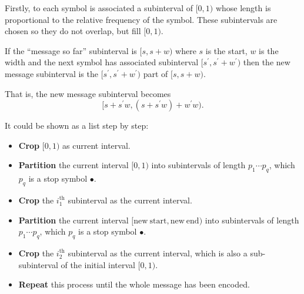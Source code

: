 \documentclass{article}
\begin{document}
Firstly, to each symbol is associated a subinterval of $[0, 1)$ whose length is proportional to the relative frequency of the symbol. These subintervals are chosen so they do not overlap, but fill $[0, 1)$.

If the ``message so far'' subinterval is $[s, s+w)$ where $s$ is the start, $w$ is the width and the next symbol has associated subinterval $[s^{\prime}, s^{\prime}+w^{\prime})$ then the new message subinterval is the $[s^{\prime}, s^{\prime}+w^{\prime})$ part of $[s, s+w)$.

That is, the new message subinterval becomes \[[s+s^{\prime}w, (s+s^{\prime}w)+w^{\prime}w).\]

It could be shown as a list step by step:

\begin{itemize}
    \item \textbf{Crop} $[0, 1)$ as current interval.
    \item \textbf{Partition} the current interval $[0, 1)$ into subintervals of length $p_{1} \cdots p_{q}$, which $p_{q}$ is a stop symbol $\bullet$.
    \item \textbf{Crop} the $i_{1}^{\mathrm{th}}$ subinterval as the current interval.
    \item \textbf{Partition} the current interval $[\mathrm{new\ start}, \mathrm{new\ end})$ into subintervals of length $p_{1} \cdots p_{q}$, which $p_{q}$ is a stop symbol $\bullet$.
    \item \textbf{Crop} the $i_{2}^{\mathrm{th}}$ subinterval as the current interval, which is also a sub-subinterval of the initial interval $[0, 1)$.
    \item \textbf{Repeat} this process until the whole message has been encoded.
\end{itemize}
\end{document}
